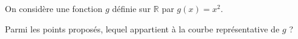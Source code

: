 
On considère une fonction $g$ définie sur $\mathbb{R}$ par $g(x)=x^2$.

Parmi les points proposés, lequel appartient à la courbe représentative de $g$ ?

\smallskip
{}
